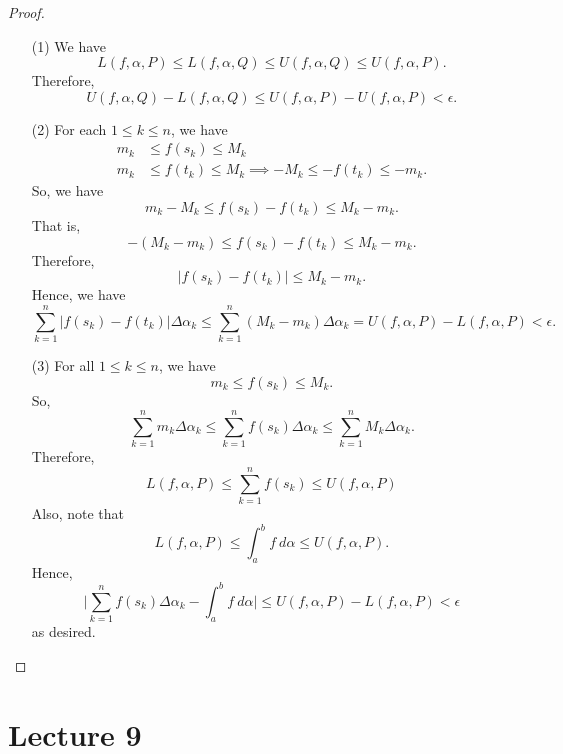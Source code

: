 \begin{proof}
\begin{enumerate}
    \item[(1)] We have 
        \[  L(f,\alpha, P) \leq L(f,\alpha, Q ) \leq U(f,\alpha, Q) \leq U(f,\alpha, P). \]
        Therefore, 
        \[  U(f,\alpha, Q ) - L(f,\alpha,Q) \leq U(f,\alpha, P) - U(f,\alpha, P) < \epsilon. \]
    \item[(2)] For each \( 1 \leq k \leq n  \), we have 
        \begin{align*}
            {m}_{k } &\leq f({s}_{k}) \leq {M}_{k} \\
            {m}_{k}&\leq f({t}_{k}) \leq {M}_{k} \implies - {M}_{k } \leq - f({t}_{k}) \leq - {m}_{k}.
        \end{align*}
        So, we have 
        \[  {m}_{k } - {M}_{k } \leq f({s}_{k}) - f({t}_{k}) \leq {M}_{k } - {m}_{k}. \]
        That is, 
        \[  - ({M}_{k } - {m}_{k}) \leq f({s}_{k}) - f({t}_{k}) \leq {M}_{k } - {m}_{k}. \]
        Therefore, 
        \[  | f({s}_{k}) - f({t}_{k})  | \leq {M}_{k } - {m}_{k}. \]
        Hence, we have 
        \[ \sum_{ k=1  }^{ n } | f({s}_{k}) - f({t}_{k}) |  \Delta {\alpha}_{k } \leq \sum_{ k=1  }^{ n } ({M}_{k } - {m}_{k}) \Delta {\alpha}_{k } = U(f,\alpha, P) - L(f,\alpha,P) < \epsilon. \]
    \item[(3)] For all \( 1 \leq k \leq n  \), we have 
        \[  {m}_{k } \leq f({s}_{k}) \leq {M}_{k }. \]
        So, 
        \[  \sum_{ k=1  }^{ n } {m}_{k } \Delta {\alpha}_{k } \leq \sum_{ k=1  }^{ n } f({s}_{k}) \Delta {\alpha}_{k } \leq \sum_{ k=1  }^{ n } {M}_{k } \Delta {\alpha}_{k }. \]
        Therefore, 
        \[  L(f,\alpha, P) \leq \sum_{ k=1  }^{ n } f({s}_{k}) \leq U(f,\alpha,P) \tag{I} \]
        Also, note that 
        \[  L(f,\alpha,P) \leq \int_{ a }^{ b }  f  \ d \alpha \leq U(f,\alpha, P). \tag{II} \]
        Hence,
        \[  \Big| \sum_{ k=1  }^{ n } f({s}_{k}) \Delta {\alpha}_{k } - \int_{ a }^{ b }  f \ d \alpha \Big|  \leq U(f,\alpha, P) - L(f,\alpha, P) < \epsilon \]
        as desired.
\end{enumerate}
\end{proof}







\section{Lecture 9}

